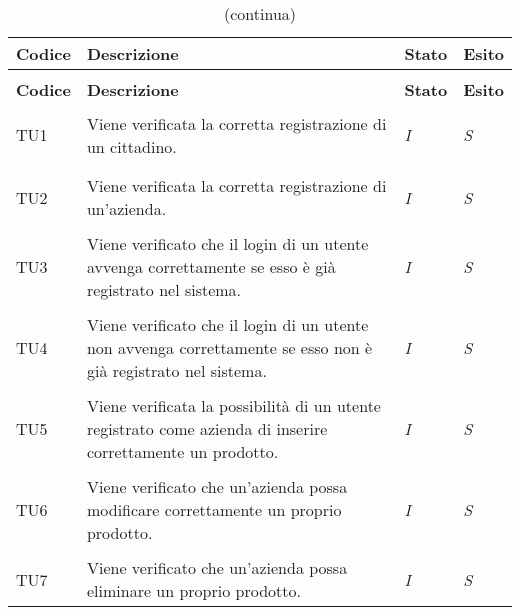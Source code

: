 		\begin{longtable}{ >{\centering}p{} >{}p{}
				>{\centering}p{} >{\centering}p{}}
			
			\caption{Riepilogo Test di Unità}\\	
			\rowcolorhead
			\textbf{\color{white}Codice} 
			& \centering\textbf{\color{white}Descrizione} 
			& \centering\textbf{\color{white}Stato}
			& \centering\textbf{\color{white}Esito} 
			\tabularnewline %
			\endfirsthead	
			
			\rowcolor{white}\caption[]{(continua)}\\	
			\rowcolorhead
			\textbf{\color{white}Codice} 
			& \centering\textbf{\centering\color{white}Descrizione} 
			& \centering\textbf{\color{white}Stato}
			& \centering\textbf{\color{white}Esito} 
			\tabularnewline %
			\endhead	
			
			
			\hypertarget{TU1}{TU1} & Viene verificata la corretta 
			registrazione di un cittadino. & \textit{I} & \textit{S}\\ 
			
			\tabularnewline
			\hypertarget{TU2}{TU2} & Viene verificata la corretta 
			registrazione di un'azienda. & \textit{I} & \textit{S}\\
			
			\tabularnewline
			\hypertarget{TU3}{TU3} & Viene verificato che il login di un utente 
			avvenga correttamente se esso è già registrato nel sistema. & 
			\textit{I} & \textit{S}\\ 
			
			\tabularnewline
			\hypertarget{TU4}{TU4} & Viene verificato che il login di un utente 
			non avvenga correttamente se esso non è già registrato nel sistema. 
			& \textit{I} & \textit{S}\\ 
			
			\tabularnewline
			\hypertarget{TU5}{TU5} & Viene verificata la possibilità di un 
			utente registrato come azienda di inserire correttamente un 
			prodotto. & \textit{I} & \textit{S}\\
			
			\tabularnewline
			\hypertarget{TU6}{TU6} & Viene verificato che un'azienda possa 
			modificare correttamente un proprio prodotto. & \textit{I} & 
			\textit{S}\\
			
			\tabularnewline
			\hypertarget{TU7}{TU7} & Viene verificato che un'azienda possa 
			eliminare un proprio prodotto. & \textit{I} & \textit{S}\\ 
			

\end{longtable}
